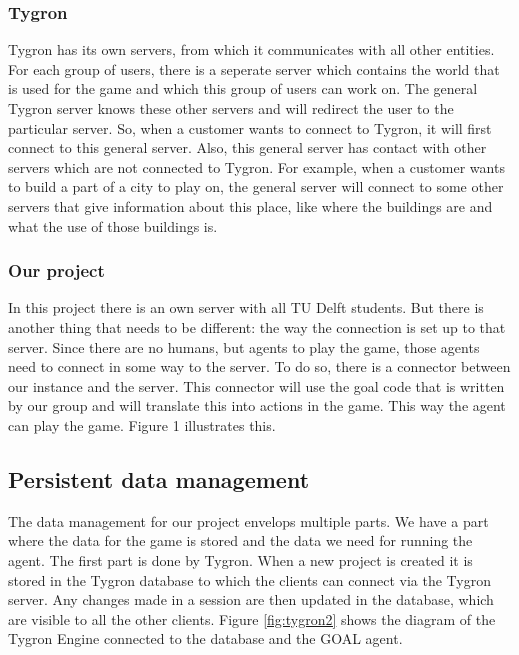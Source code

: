 \subsubsection{Tygron}
Tygron has its own servers, from which it communicates with all other entities. For each group of users, there is a seperate server which contains the world that is used for the game and which this group of users can work on. The general Tygron server knows these other servers and will redirect the user to the particular server. So, when a customer wants to connect to Tygron, it will first connect to this general server. Also, this general server has contact with other servers which are not connected to Tygron. For example, when a customer wants to build a part of a city to play on, the general server will connect to some other servers that give information about this place, like where the buildings are and what the use of those buildings is. 

\subsubsection{Our project}

In this project there is an own server with all TU Delft students. But there is another thing that needs to be different: the way the connection is set up to that server. Since there are no humans, but agents to play the game, those agents need to connect in some way to the server. To do so, there is a connector between our instance and the server. This connector will use the goal code that is written by our group and will translate this into actions in the game. This way the agent can play the game. Figure 1 illustrates this.

\newpage
\subsection{Persistent data management}
The data management for our project envelops multiple parts. We have a part where the data for the game is stored and the data we need for running the agent. The first part is done by Tygron. When a new project is created it is stored in the Tygron database to which the clients can connect via the Tygron server. Any changes made in a session are then updated in the database, which are visible to all the other clients. Figure \ref{fig:tygron2} shows the diagram of the Tygron Engine connected to the database and the GOAL agent.

